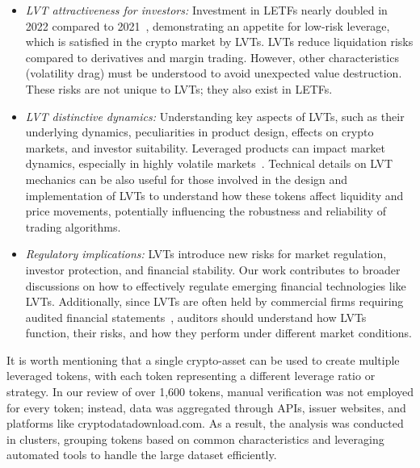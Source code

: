 \begin{itemize}
	\item \textsl{LVT attractiveness for investors:} Investment in LETFs nearly doubled in 2022 compared to 2021~\cite{FT_LETF}, demonstrating an appetite for low-risk leverage, which is satisfied in the crypto market by LVTs. LVTs reduce liquidation risks compared to derivatives and margin trading. However, other characteristics (\eg volatility drag) must be understood to avoid unexpected value destruction. These risks are not unique to LVTs; they also exist in LETFs.
	
	\item \textsl{LVT distinctive dynamics:} Understanding key aspects of LVTs, such as their underlying dynamics, peculiarities in product design, effects on crypto markets, and investor suitability. Leveraged products can impact market dynamics, especially in highly volatile markets~\cite{shum2016intraday}. Technical details on LVT mechanics can be also useful for those involved in the design and implementation of LVTs to understand how these tokens affect liquidity and price movements, potentially influencing the robustness and reliability of trading algorithms.
	
	\item \textsl{Regulatory implications:} LVTs introduce new risks for market regulation, investor protection, and financial stability. Our work contributes to broader discussions on how to effectively regulate emerging financial technologies like LVTs. Additionally, since LVTs are often held by commercial firms requiring audited financial statements~\cite{devault2021blessing}, auditors should understand how LVTs function, their risks, and how they perform under different market conditions.
\end{itemize}

It is worth mentioning that a single crypto-asset can be used to create multiple leveraged tokens, with each token representing a different leverage ratio or strategy. In our review of over 1,600 tokens, manual verification was not employed for every token; instead, data was aggregated through APIs, issuer websites, and platforms like cryptodatadownload.com. As a result, the analysis was conducted in clusters, grouping tokens based on common characteristics and leveraging automated tools to handle the large dataset efficiently.

